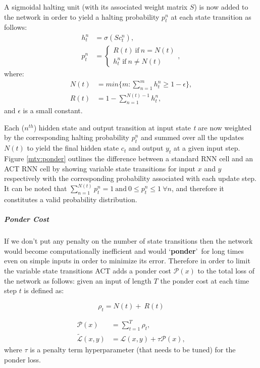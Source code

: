 A sigmoidal halting unit (with its associated weight matrix $S$) is now added to the network in order to yield a halting probability $p_t^n$ at each state transition as follows:
\begin{equation}
\begin{aligned}
h_t^n &= \sigma(Sc_t^n), \\
p_t^n &= \begin{cases} R(t)\ \text{if}\ n = N(t) \\ h_t^n\ \text{if}\ n \neq N(t)  \end{cases},
\end{aligned}
\end{equation}
where:
\begin{equation}
\begin{aligned}
N(t) &= min\{m : \sum_{n=1}^m h_t^n \geq 1 - \epsilon\}, \\
R(t) &= 1 - \sum_{n=1}^{N(t)-1} h_t^n,
\end{aligned}	
\end{equation}
and $\epsilon$ is a small constant.

Each ($n^{th}$) hidden state and output transition at input state \textit{t} are now weighted by the corresponding halting probability $p_t^n$ and summed over all the updates $N(t)$ to yield the final hidden state $c_t$ and output $y_t$ at a given input step. Figure \ref{mtv:ponder} outlines the difference between a standard RNN cell and an ACT RNN cell by showing variable state transitions for input $x$ and $y$ respectively with the corresponding probability associated with each update step. It can be noted that $\sum_{n=1}^{N(t)} p_t^n = 1\ \text{and}\ 0 \leq p_t^n \leq 1\ \forall n$, and therefore it constitutes a valid probability distribution.

\subparagraph{Ponder Cost} If we don't put any penalty on the number of state transitions then the network would become computationally inefficient and would \lq \textbf{ponder}{}\rq\ for long times even on simple inputs in order to minimize its error. Therefore in order to limit the variable state transitions ACT adds a ponder cost $\mathcal{P}(x)$ to the total loss of the network as follows:
given an input of length $T$ the ponder cost at each time step $t$ is defined as:

\begin{equation}
\rho_t = N(t) +\ R(t)
\end{equation}

\begin{equation}
\begin{aligned}
\mathcal{P}(x) &= \sum_{t=1}^T \rho_t, \\
\widetilde{\mathcal{L}}(x,y) &= \mathcal{L}(x,y) + \tau\mathcal{P}(x),
\end{aligned}	
\end{equation}
where $\tau$ is a penalty term hyperparameter (that needs to be tuned) for the ponder loss.

